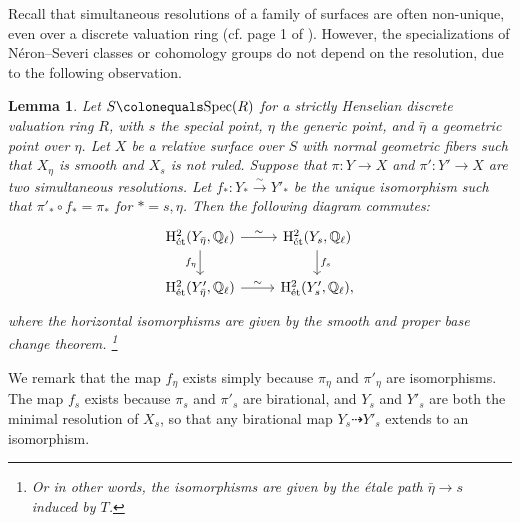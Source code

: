 \documentclass[11pt, letterpaper]{amsart}
\theoremstyle{plain}
\newtheorem{lemma}[theorem]{Lemma}
\theoremstyle{definition}
\newcommand{\IQ}{\mathbb{Q}}
\newcommand{\Spec}{\mathrm{Spec}}
\newcommand{\<}{\langle}
\renewcommand{\>}{\rangle}
\newcommand{\et}{\mathrm{{\acute{e}}t}}
\renewcommand{\H}{\mathrm{H}}
\newcommand{\sto}{\stackrel{\sim}{\to}}
\begin{document}
Recall that simultaneous resolutions of a family of surfaces are often non-unique, even over a discrete valuation ring (cf. page 1 of \cite{Artin-Res}). However, the specializations of N\'eron--Severi classes or cohomology groups do not depend on the resolution, due to the following observation.
\begin{lemma}
\label{lem: specialization resolution}
    Let $S \colonequals \Spec(R)$ for a strictly Henselian discrete valuation ring $R$, with $s$ the special point, $\eta$ the generic point, and $\bar{\eta}$ a geometric point over $\eta$. 
    Let $X$ be a relative surface over $S$ with normal geometric fibers such that $X_\eta$ is smooth and $X_s$ is not ruled. Suppose that $\pi : Y \to X$ and $\pi' : Y' \to X$ are two simultaneous resolutions. Let $f_* : Y_* \sto Y'_*$ be the unique isomorphism such that $ \pi'_* \circ f_* = \pi_{*}$ for $* = s, \eta$. Then the following diagram commutes: 
    \begin{equation}
    \label{diag: specialization of graph}
        \begin{tikzcd}
	{\H^2_\et(Y_{\bar{\eta}}, \IQ_\ell)} & {\H^2_\et(Y_s, \IQ_\ell)} \\
	{\H^2_\et(Y'_{\bar{\eta}}, \IQ_\ell)} & {\H^2_\et(Y'_s, \IQ_\ell)},
	\arrow["\sim", from=1-1, to=1-2]
	\arrow["{f_{\eta}}"', from=1-1, to=2-1]
	\arrow["{f_s}", from=1-2, to=2-2]
	\arrow["\sim", from=2-1, to=2-2]
    \end{tikzcd}
    \end{equation}
    where the horizontal isomorphisms are given by the smooth and proper base change theorem. \footnote{Or in other words, the isomorphisms  are given by the \'etale path $\bar{\eta} \to s$ induced by $T$.} 
\end{lemma}
We remark that the map $f_{\eta}$ exists simply because $\pi_{\eta}$ and $\pi'_{\eta}$ are isomorphisms.
The map $f_s$ exists because $\pi_s$ and $\pi'_s$ are birational, and $Y_s$ and $Y'_s$ are both the minimal  resolution of $X_s$, so that any birational map $Y_s \dashrightarrow Y'_s$ extends to an isomorphism. 
\end{document}
